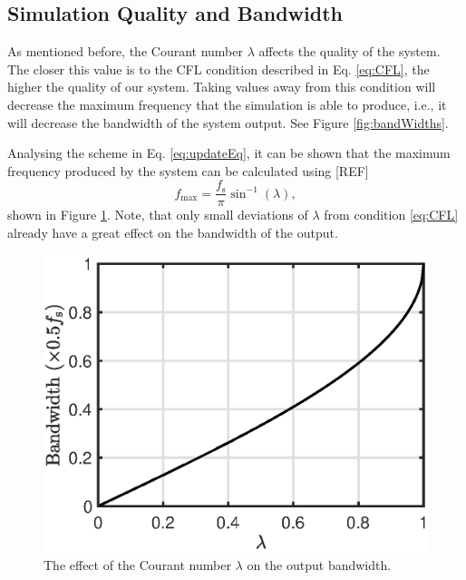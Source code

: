 \documentclass[preprint]{JASA}
\begin{document}
\subsection{Simulation Quality and Bandwidth}
As mentioned before, the Courant number $\lambda$ affects the quality of the system. The closer this value is to the CFL condition described in Eq. \eqref{eq:CFL}, the higher the quality of our system. Taking values away from this condition will decrease the maximum frequency that the simulation is able to produce, i.e., it will decrease the bandwidth of the system output. See Figure \ref{fig:bandWidths}.
%
\begin{figure}
\end{figure}
%
Analysing the scheme in Eq. \eqref{eq:updateEq}, it can be shown that the maximum frequency produced by the system can be calculated using [REF]
\begin{equation}
    f_\text{max} = \frac{f_\text{s}}{\pi} \sin^{-1}(\lambda),
\end{equation}
shown in Figure \ref{fig:bandWidthFormula}.
%
Note, that only small deviations of $\lambda$ from condition \eqref{eq:CFL} already have a great effect on the bandwidth of the output.

\begin{figure}
\includegraphics[width=\reprintcolumnwidth]{bandwidthPlot}
\caption{\label{fig:bandWidthFormula}{The effect of the Courant number $\lambda$ on the output bandwidth.}}
\end{figure} 
\end{document}

